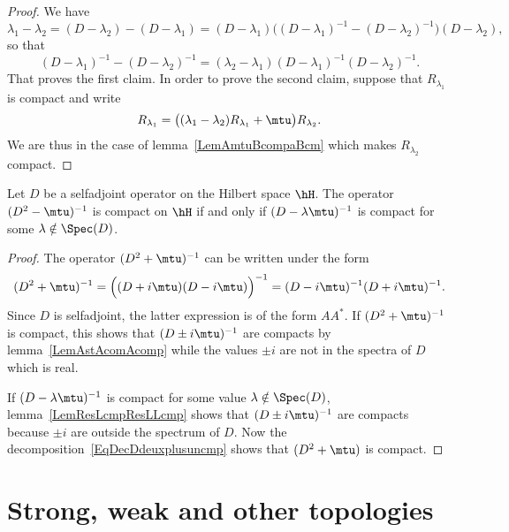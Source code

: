 \begin{proof}
	We have
	\begin{equation}
		\lambda_1-\lambda_2=(D-\lambda_2)-(D-\lambda_1)=(D-\lambda_1)\Big( (D-\lambda_1)^{-1}-(D-\lambda_2)^{-1} \Big)(D-\lambda_2),
	\end{equation}
	so that
	\begin{equation}
		(D-\lambda_1)^{-1}-(D-\lambda_2)^{-1}=(\lambda_2-\lambda_1)(D-\lambda_1)^{-1}(D-\lambda_2)^{-1}.
	\end{equation}
	That proves the first claim. In order to prove the second claim, suppose that $R_{\lambda_1}$ is compact and write
	\begin{equation}
		R_{\lambda_1}=\big( (\lambda_1-\lambda_2)R_{\lambda_1}+\mtu \big)R_{\lambda_2}.
	\end{equation}
	We are thus in the case of lemma~\ref{LemAmtuBcompaBcm} which makes $R_{\lambda_2}$ compact.
\end{proof}

\begin{proposition}
	Let $D$ be a selfadjoint operator on the Hilbert space $\hH$. The operator $(D^2-\mtu)^{-1}$ is compact on $\hH$ if and only if $(D-\lambda\mtu)^{-1}$ is compact for some $\lambda\notin\Spec(D)$.
\end{proposition}

\begin{proof}
	The operator $(D^2+\mtu)^{-1}$ can be written under the form
	\begin{equation}		\label{EqDecDdeuxplusuncmp}
		(D^2+\mtu)^{-1}=\Big( (D+i\mtu)(D-i\mtu) \Big)^{-1}=(D-i\mtu)^{-1}(D+i\mtu)^{-1}.
	\end{equation}
	Since $D$ is selfadjoint, the latter expression is of the form $AA^*$. If $(D^2+\mtu)^{-1}$ is compact, this shows that $(D\pm i\mtu)^{-1}$ are compacts by lemma~\ref{LemAstAcomAcomp} while the values $\pm i$ are not in the spectra of $D$ which is real.

	If $(D-\lambda\mtu)^{-1}$ is compact for some value $\lambda\notin\Spec(D)$, lemma~\ref{LemResLcmpResLLcmp} shows that $(D\pm i\mtu)^{-1}$ are compacts because $\pm i$ are outside the spectrum of $D$. Now the decomposition~\ref{EqDecDdeuxplusuncmp} shows that $(D^2+\mtu)$ is compact.
\end{proof}

					\section{Strong, weak and other topologies}

